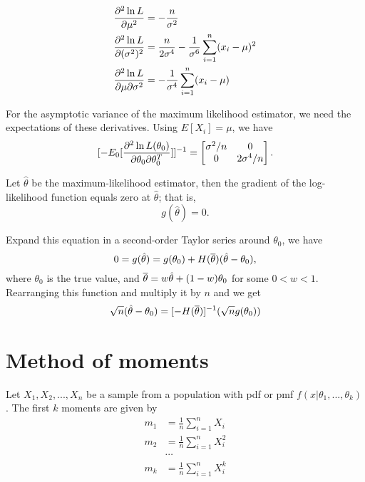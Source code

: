 \begin{refsection}
\begin{example}\cite[548]{greene2017econometric}

\begin{align*}
\frac{\partial^2 \ln L}{\partial \mu^2} &= -\frac{n}{\sigma^2} \\
\frac{\partial^2 \ln L}{\partial (\sigma^2)^2} &= \frac{n}{2\sigma^4} - \frac{1}{\sigma^6}\sum_{i=1}^n (x_i - \mu)^2 \\
\frac{\partial^2 \ln L}{\partial \mu \partial \sigma^2} &= -\frac{1}{\sigma^4}\sum_{i=1}^n (x_i - \mu)
\end{align*}	

For the asymptotic variance of the maximum likelihood estimator, we need the expectations of these derivatives. Using $E[X_i] = \mu$, we have
$$[-E_0[\frac{\partial^2 \ln L(\theta_0)}{\partial \theta_0 \partial \theta_0^T}]]^{-1} = \begin{bmatrix}
\sigma^2/n & 0 \\
0 & 2\sigma^4/n
\end{bmatrix}.$$
\end{example}



Let $\hat{\theta}$ be the maximum-likelihood estimator, then the gradient of the log-likelihood function equals zero at $\hat{\theta}$; that is,
$$g(\hat{\theta}) = 0.$$

Expand this equation in a second-order Taylor series around $\theta_0$, we have
$$ 0 = g(\hat{\theta}) = g(\theta_0) + H(\overline{\theta})(\hat{\theta} - \theta_0),$$
where $\theta_0$ is the true value, and $\overline{\theta} = w\hat{\theta} + (1-w)\theta_0$ for some $0<w<1$. Rearranging this function and multiply it by $n$ and we get
$$\sqrt{n}(\hat{\theta} - \theta_0) = [-H(\overline{\theta})]^{-1}(\sqrt{n}g(\theta_0))$$



\section{Method of moments}

\begin{definition}\cite[312]{casella2002statistical} Let $X_1,X_2,...,X_n$ be a sample from a population with pdf or pmf $f(x|\theta_1,...,\theta_k)$. The first $k$ moments are given by
\begin{align*}
m_1 &= \frac{1}{n}\sum_{i=1}^n X_i \\
m_2 &= \frac{1}{n}\sum_{i=1}^n X_i^2 \\
&\cdots \\
m_k &= \frac{1}{n}\sum_{i=1}^n X_i^k 
\end{align*}	
\end{definition}



\end{refsection}
